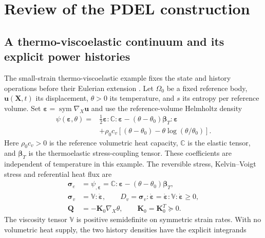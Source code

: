 \documentclass[11pt,a4paper]{article}
\theoremstyle{remark}\newtheorem{remark}{Remark}
\numberwithin{equation}{section}
\newcommand{\XX}{\boldsymbol X}
\newcommand{\grad}{\nabla}
\newcommand{\sym}{\operatorname{sym}}
\begin{document}

\section{Review of the PDEL construction}\label{sec:review}
\subsection{A thermo-viscoelastic continuum and its explicit power histories}
The small-strain thermo-viscoelastic example fixes the state and history operations before their Eulerian extension \citep{RenEntropy,RenSpending,RenEulerian,RenMultiChannel}. Let $\Omega_0$ be a fixed reference body, $\boldsymbol u(\XX,t)$ its displacement, $\theta>0$ its temperature, and $s$ its entropy per reference volume. Set $\boldsymbol\varepsilon=\sym\grad_X\boldsymbol u$ and use the reference-volume Helmholtz density
\begin{equation}
\begin{aligned}
\psi(\boldsymbol\varepsilon,\theta)
={}&\tfrac12\boldsymbol\varepsilon:\mathbb C:\boldsymbol\varepsilon
-(\theta-\theta_0)\boldsymbol\beta_T:\boldsymbol\varepsilon\\
&+\rho_0c_v\left[(\theta-\theta_0)-\theta\log(\theta/\theta_0)\right].
\end{aligned}
\label{eq:reviewfree}
\end{equation}
Here $\rho_0c_v>0$ is the reference volumetric heat capacity, $\mathbb C$ is the elastic tensor, and $\boldsymbol\beta_T$ is the thermoelastic stress-coupling tensor. These coefficients are independent of temperature in this example. The reversible stress, Kelvin--Voigt stress and referential heat flux are
\begin{equation}
\begin{aligned}
\boldsymbol\sigma_e&=\psi_{,\boldsymbol\varepsilon}
=\mathbb C:\boldsymbol\varepsilon-(\theta-\theta_0)\boldsymbol\beta_T,\\
\boldsymbol\sigma_v&=\mathbb V:\dot{\boldsymbol\varepsilon},\qquad
D_v=\boldsymbol\sigma_v:\dot{\boldsymbol\varepsilon}
=\dot{\boldsymbol\varepsilon}:\mathbb V:\dot{\boldsymbol\varepsilon}\ge0,\\
\boldsymbol Q&=-\boldsymbol K_0\grad_X\theta,
\qquad \boldsymbol K_0=\boldsymbol K_0^T\succeq0.
\end{aligned}
\label{eq:reviewconstitutive}
\end{equation}
The viscosity tensor $\mathbb V$ is positive semidefinite on symmetric strain rates. With no volumetric heat supply, the two history densities have the explicit integrands
\end{document}
